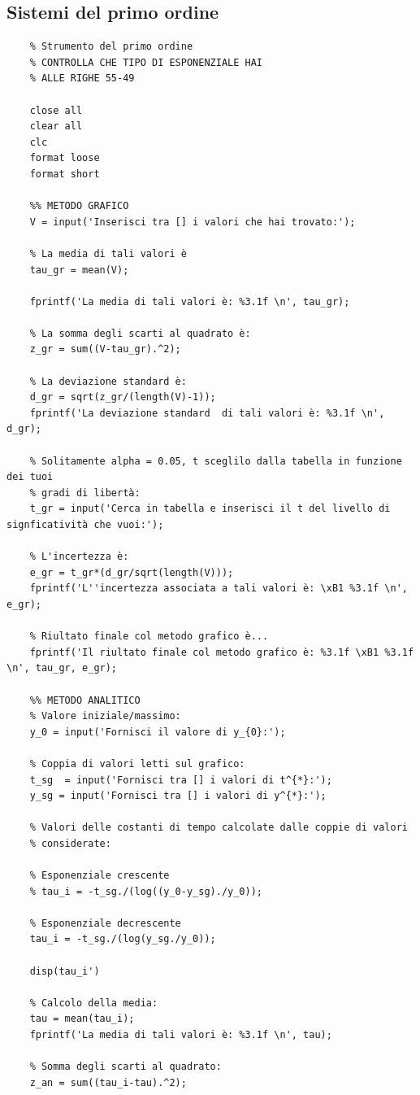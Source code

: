 \documentclass[a4paper, 12pt, twoside]{report}
\begin{document}
\subsection{Sistemi del primo ordine}
\footnotesize 
\begin{verbatim}
	% Strumento del primo ordine 
	% CONTROLLA CHE TIPO DI ESPONENZIALE HAI
	% ALLE RIGHE 55-49
	
	close all
	clear all
	clc
	format loose
	format short
	
	%% METODO GRAFICO
	V = input('Inserisci tra [] i valori che hai trovato:');
	
	% La media di tali valori è
	tau_gr = mean(V);
	
	fprintf('La media di tali valori è: %3.1f \n', tau_gr);
	
	% La somma degli scarti al quadrato è:
	z_gr = sum((V-tau_gr).^2);
	
	% La deviazione standard è: 
	d_gr = sqrt(z_gr/(length(V)-1));
	fprintf('La deviazione standard  di tali valori è: %3.1f \n', d_gr);
	
	% Solitamente alpha = 0.05, t sceglilo dalla tabella in funzione dei tuoi
	% gradi di libertà:
	t_gr = input('Cerca in tabella e inserisci il t del livello di signficatività che vuoi:'); 
	
	% L'incertezza è:
	e_gr = t_gr*(d_gr/sqrt(length(V)));
	fprintf('L''incertezza associata a tali valori è: \xB1 %3.1f \n', e_gr);
	
	% Riultato finale col metodo grafico è...
	fprintf('Il riultato finale col metodo grafico è: %3.1f \xB1 %3.1f \n', tau_gr, e_gr);

	%% METODO ANALITICO
	% Valore iniziale/massimo: 
	y_0 = input('Fornisci il valore di y_{0}:');
	
	% Coppia di valori letti sul grafico:
	t_sg  = input('Fornisci tra [] i valori di t^{*}:');
	y_sg = input('Fornisci tra [] i valori di y^{*}:');
	
	% Valori delle costanti di tempo calcolate dalle coppie di valori
	% considerate:
	
	% Esponenziale crescente 
	% tau_i = -t_sg./(log((y_0-y_sg)./y_0));
	
	% Esponenziale decrescente
	tau_i = -t_sg./(log(y_sg./y_0));
	
	disp(tau_i')
	
	% Calcolo della media:
	tau = mean(tau_i);
	fprintf('La media di tali valori è: %3.1f \n', tau);
	
	% Somma degli scarti al quadrato:
	z_an = sum((tau_i-tau).^2);
	

\end{verbatim}
\end{document}
